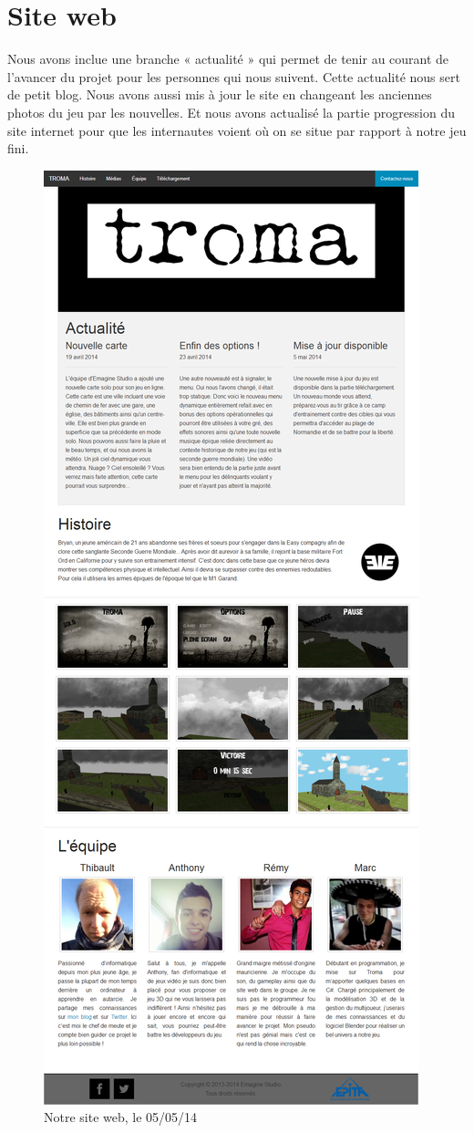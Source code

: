 \documentclass[11pt]{report}
\begin{document}
\newpage
\section{Site web}

Nous avons inclue une branche « actualité » qui permet de tenir au courant de l’avancer du projet pour les personnes qui nous suivent. Cette actualité nous sert de petit blog. Nous avons aussi mis à jour le site en changeant les anciennes photos du jeu par les nouvelles. Et nous avons actualisé la partie progression du site internet pour que les internautes voient où on se situe par rapport à notre jeu fini.\\

\begin{figure}[htbp]
\centering
\includegraphics[scale=0.165]{site_web.png}
\caption{Notre site web, le 05/05/14}
\end{figure}
\end{document}
